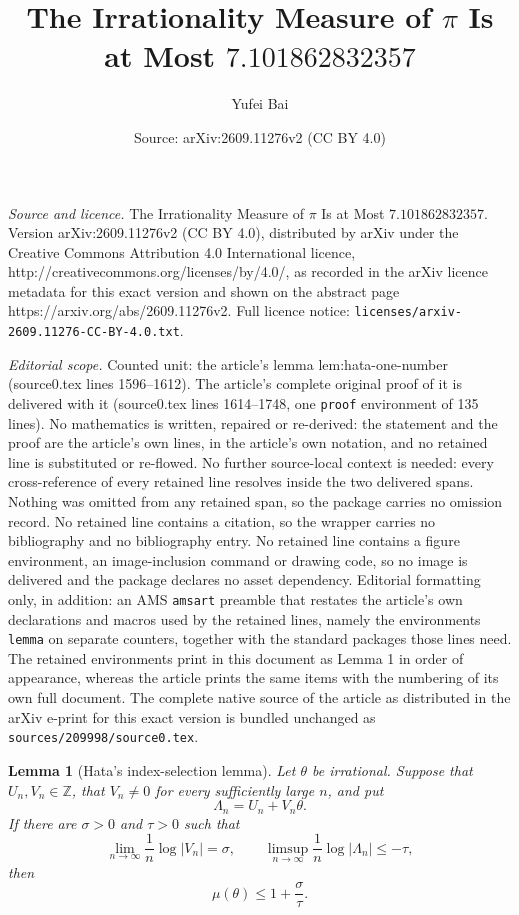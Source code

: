 \documentclass[10pt,a4paper]{amsart}
\title{The Irrationality Measure of $\pi$ Is at Most $7.101862832357$}
\author{Yufei Bai}
\date{Source: arXiv:2609.11276v2 (CC BY 4.0)}
\newtheorem{lemma}{Lemma}
\begin{document}
\maketitle

\noindent\emph{Source and licence.} The Irrationality Measure of $\pi$ Is at Most $7.101862832357$. Version arXiv:2609.11276v2 (CC BY 4.0), distributed by arXiv under the Creative Commons Attribution 4.0 International licence, http://creativecommons.org/licenses/by/4.0/, as recorded in the arXiv licence metadata for this exact version and shown on the abstract page https://arxiv.org/abs/2609.11276v2. Full licence notice: \texttt{licenses/arxiv-2609.11276-CC-BY-4.0.txt}.\par\smallskip

\noindent\textit{Editorial scope.} Counted unit: the article's lemma lem:hata-one-number (source0.tex lines 1596--1612). The article's complete original proof of it is delivered with it (source0.tex lines 1614--1748, one \texttt{proof} environment of 135 lines). No mathematics is written, repaired or re-derived: the statement and the proof are the article's own lines, in the article's own notation, and no retained line is substituted or re-flowed.  No further source-local context is needed: every cross-reference of every retained line resolves inside the two delivered spans.  Nothing was omitted from any retained span, so the package carries no omission record.  No retained line contains a citation, so the wrapper carries no bibliography and no bibliography entry.  No retained line contains a figure environment, an image-inclusion command or drawing code, so no image is delivered and the package declares no asset dependency.  Editorial formatting only, in addition: an AMS \texttt{amsart} preamble that restates the article's own declarations and macros used by the retained lines, namely the environments \texttt{lemma} on separate counters, together with the standard packages those lines need.  The retained environments print in this document as Lemma 1 in order of appearance, whereas the article prints the same items with the numbering of its own full document.  The complete native source of the article as distributed in the arXiv e-print for this exact version is bundled unchanged as \texttt{sources/209998/source0.tex}.
\begin{lemma}[Hata's index-selection lemma]\label{lem:hata-one-number}
Let \(\theta\) be irrational.  Suppose that \(U_n,V_n\in\mathbb Z\),
that \(V_n\ne0\) for every sufficiently large \(n\), and put
\[
 \Lambda_n=U_n+V_n\theta.
\]
If there are \(\sigma>0\) and \(\tau>0\) such that
\begin{equation}\label{eq:hata-hypotheses}
 \lim_{n\to\infty}\frac1n\log|V_n|=\sigma,
 \qquad
 \limsup_{n\to\infty}\frac1n\log|\Lambda_n|\leq-\tau,
\end{equation}
then
\begin{equation}\label{eq:hata-conclusion}
 \mu(\theta)\leq1+\frac{\sigma}{\tau}.
\end{equation}
\end{lemma}
\end{document}
